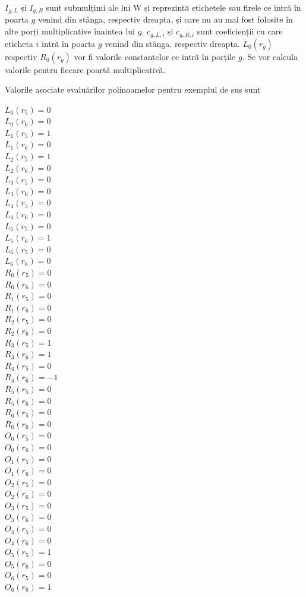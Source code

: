 $I_{g,L}$ și $I_{g,R}$ sunt submulțimi ale lui W și reprezintă etichetele sau firele ce intră în poarta $g$ venind din stânga, respectiv dreapta, și care nu au mai fost folosite în alte porți multiplicative înaintea lui $g$.
$c_{g,L,i}$ și $c_{g,R,i}$ sunt coeficienții cu care eticheta $i$ intră în poarta $g$ venind din stânga, respectiv dreapta.
$L_0(r_g)$ respectiv $R_0(r_g)$ vor fi valorile constantelor ce intră în porțile $g$. 
Se vor calcula valorile pentru fiecare poartă multiplicativă.

Valorile asociate evaluărilor polinoamelor pentru exemplul de sus sunt
\begin{multicols}{3}
$L_0(r_5) = 0$ \\
$L_0(r_6) = 0$ \\
$L_1(r_5) = 1$ \\
$L_1(r_6) = 0$ \\
$L_2(r_5) = 1$ \\
$L_2(r_6) = 0$ \\
$L_3(r_5) = 0$ \\
$L_3(r_6) = 0$ \\
$L_4(r_5) = 0$ \\
$L_4(r_6) = 0$ \\
$L_5(r_5) = 0$ \\
$L_5(r_6) = 1$ \\
$L_6(r_5) = 0$ \\
$L_6(r_6) = 0$ \\
\vfill
\columnbreak
$R_0(r_5) = 0$ \\
$R_0(r_6) = 0$ \\
$R_1(r_5) = 0$ \\
$R_1(r_6) = 0$ \\
$R_2(r_5) = 0$ \\
$R_2(r_6) = 0$ \\
$R_3(r_5) = 1$ \\
$R_3(r_6) = 1$ \\
$R_4(r_5) = 0$ \\
$R_4(r_6) = -1$ \\
$R_5(r_5) = 0$ \\
$R_5(r_6) = 0$ \\
$R_6(r_5) = 0$ \\
$R_6(r_6) = 0$ \\
\vfill
\columnbreak
$O_0(r_5) = 0$ \\
$O_0(r_6) = 0$ \\
$O_1(r_5) = 0$ \\
$O_1(r_6) = 0$ \\
$O_2(r_5) = 0$ \\
$O_2(r_6) = 0$ \\
$O_3(r_5) = 0$ \\
$O_3(r_6) = 0$ \\
$O_4(r_5) = 0$ \\
$O_4(r_6) = 0$ \\
$O_5(r_5) = 1$ \\
$O_5(r_6) = 0$ \\
$O_6(r_5) = 0$ \\
$O_6(r_6) = 1$ \\
\end{multicols}


